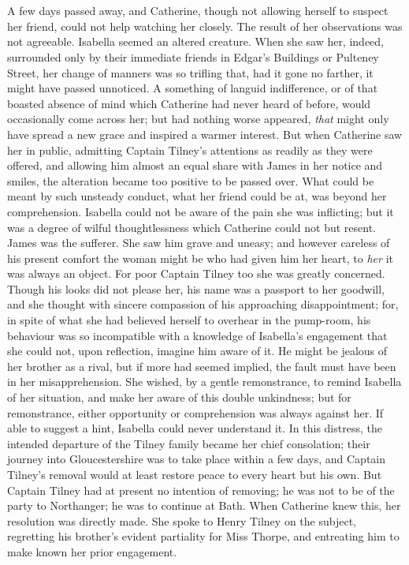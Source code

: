 \chapter[Chapter \thechapter]{} 
	
\lettrine{A}{} few days passed away, and Catherine, though not allowing herself to suspect her friend, could not help watching her closely. The result of her observations was not agreeable. Isabella seemed an altered creature. When she saw her, indeed, surrounded only by their immediate friends in Edgar's Buildings or Pulteney Street, her change of manners was so trifling that, had it gone no farther, it might have passed unnoticed. A something of languid indifference, or of that boasted absence of mind which Catherine had never heard of before, would occasionally come across her; but had nothing worse appeared, \textit{that} might only have spread a new grace and inspired a warmer interest. But when Catherine saw her in public, admitting Captain Tilney's attentions as readily as they were offered, and allowing him almost an equal share with James in her notice and smiles, the alteration became too positive to be passed over. What could be meant by such unsteady conduct, what her friend could be at, was beyond her comprehension. Isabella could not be aware of the pain she was inflicting; but it was a degree of wilful thoughtlessness which Catherine could not but resent. James was the sufferer. She saw him grave and uneasy; and however careless of his present comfort the woman might be who had given him her heart, to \textit{her} it was always an object. For poor Captain Tilney too she was greatly concerned. Though his looks did not please her, his name was a passport to her goodwill, and she thought with sincere compassion of his approaching disappointment; for, in spite of what she had believed herself to overhear in the pump-room, his behaviour was so incompatible with a knowledge of Isabella's engagement that she could not, upon reflection, imagine him aware of it. He might be jealous of her brother as a rival, but if more had seemed implied, the fault must have been in her misapprehension. She wished, by a gentle remonstrance, to remind Isabella of her situation, and make her aware of this double unkindness; but for remonstrance, either opportunity or comprehension was always against her. If able to suggest a hint, Isabella could never understand it. In this distress, the intended departure of the Tilney family became her chief consolation; their journey into Gloucestershire was to take place within a few days, and Captain Tilney's removal would at least restore peace to every heart but his own. But Captain Tilney had at present no intention of removing; he was not to be of the party to Northanger; he was to continue at Bath. When Catherine knew this, her resolution was directly made. She spoke to Henry Tilney on the subject, regretting his brother's evident partiality for Miss Thorpe, and entreating him to make known her prior engagement. 

